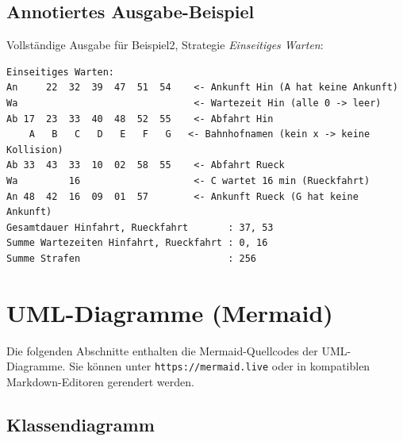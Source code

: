 \documentclass[12pt,a4paper]{article}
\begin{document}
\subsection{Annotiertes Ausgabe-Beispiel}

Vollständige Ausgabe für Beispiel2, Strategie \textit{Einseitiges Warten}:

\begin{verbatim}
Einseitiges Warten:
An     22  32  39  47  51  54    <- Ankunft Hin (A hat keine Ankunft)
Wa                               <- Wartezeit Hin (alle 0 -> leer)
Ab 17  23  33  40  48  52  55    <- Abfahrt Hin
    A   B   C   D   E   F   G   <- Bahnhofnamen (kein x -> keine Kollision)
Ab 33  43  33  10  02  58  55    <- Abfahrt Rueck
Wa         16                    <- C wartet 16 min (Rueckfahrt)
An 48  42  16  09  01  57        <- Ankunft Rueck (G hat keine Ankunft)
Gesamtdauer Hinfahrt, Rueckfahrt       : 37, 53
Summe Wartezeiten Hinfahrt, Rueckfahrt : 0, 16
Summe Strafen                          : 256
\end{verbatim}

\section{UML-Diagramme (Mermaid)}

Die folgenden Abschnitte enthalten die Mermaid-Quellcodes der UML-Diagramme. Sie können unter \texttt{https://mermaid.live} oder in kompatiblen Markdown-Editoren gerendert werden.

\subsection{Klassendiagramm}
\end{document}
